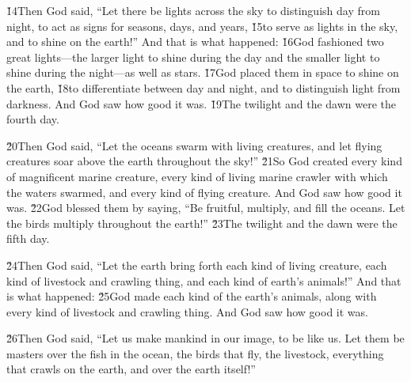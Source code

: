 \v{14}Then God said, ``Let there be lights across the sky to distinguish day from night, to act as signs for seasons, days, and years, \v{15}to serve as lights in the sky, and to shine on the earth!'' And that is what happened: \v{16}God fashioned two great lights---the larger light to shine during the day and the smaller light to shine during the night---as well as stars. \v{17}God placed them in space to shine on the earth, \v{18}to differentiate between day and night, and to distinguish light from darkness. And God saw how good it was. \v{19}The twilight and the dawn were the fourth day.

\v{20}Then God said, ``Let the oceans swarm with living creatures, and let flying creatures soar above the earth throughout the sky!'' \v{21}So God created every kind of magnificent marine creature, every kind of living marine crawler with which the waters swarmed, and every kind of flying creature. And God saw how good it was. \v{22}God blessed them by saying, ``Be fruitful, multiply, and fill the oceans. Let the birds multiply throughout the earth!'' \v{23}The twilight and the dawn were the fifth day.

\v{24}Then God said, ``Let the earth bring forth each kind of living creature, each kind of livestock and crawling thing, and each kind of earth's animals!'' And that is what happened: \v{25}God made each kind of the earth's animals, along with every kind of livestock and crawling thing. And God saw how good it was.

\v{26}Then God said, ``Let us make mankind in our image, to be like us. Let them be masters over the fish in the ocean, the birds that fly, the livestock, everything that crawls on the earth, and over the earth itself!''

